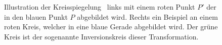 \begin{figure}
    \centering
    \begin{minipage}{0.49\textwidth}
        \centering
        \raisebox{0.1\height}{%
        }
    \end{minipage}
    \hfill
    \begin{minipage}{0.49\textwidth}
        \centering
        
    \end{minipage}
    \caption{Illustration der Kreisspiegelung~\cite{kreisspiegelung} links
    mit einem roten Punkt $P'$ der in den blauen Punkt $P$ abgebildet wird. 
    Rechts ein Beispiel an einem roten Kreis, welcher in eine blaue Gerade abgebildet wird.
    Der grüne Kreis ist der sogenannte Inversionskreis dieser Transformation.}
    \label{fig:kreisspiegelung}
\end{figure}

